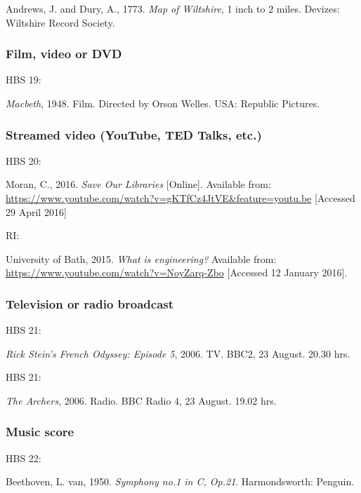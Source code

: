 Andrews, J. and Dury, A., 1773. \emph{Map of Wiltshire}, 1 inch to 2 miles. Devizes: Wiltshire Record Society.



\subsubsection*{Film, video or DVD}

HBS 19: \cite{macbeth1948}

\emph{Macbeth}, 1948. Film. Directed by Orson Welles. USA: Republic Pictures.



\subsubsection*{Streamed video (YouTube, TED Talks, etc.)}

HBS 20: \cite{moran2016sol}

Moran, C., 2016. \emph{Save Our Libraries} [Online]. Available from: \url{https://www.youtube.com/watch?v=gKTfCz4JtVE&feature=youtu.be} [Accessed 29 April 2016]


RI: \cite{uob2015wie}

University of Bath, 2015. \emph{What is engineering?} Available from: \url{https://www.youtube.com/watch?v=NoyZarq-Zbo} [Accessed 12 January 2016].



\subsubsection*{Television or radio broadcast}

HBS 21: \cite{rsfo2006ep5}

\emph{Rick Stein's French Odyssey: Episode 5}, 2006. TV. BBC2, 23 August. 20.30 hrs.



HBS 21: \cite{archers20060823}

\emph{The Archers}, 2006. Radio. BBC Radio 4, 23 August. 19.02 hrs.



\subsubsection*{Music score}

HBS 22: \cite{beethoven1950symph1}

Beethoven, L. van, 1950. \emph{Symphony no.1 in C, Op.21}. Harmondsworth: Penguin.



